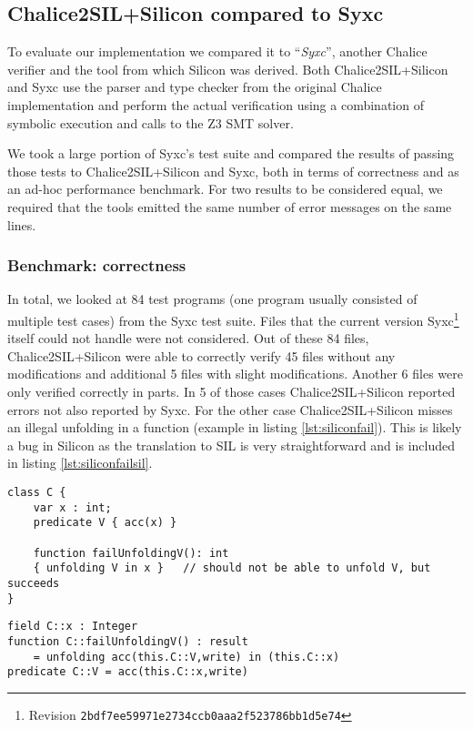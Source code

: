 \subsection{Chalice2SIL+Silicon compared to Syxc}
To evaluate our implementation we compared it to ``\emph{Syxc}'', another Chalice verifier and the tool from which Silicon was derived.
Both Chalice2SIL+Silicon and Syxc use the parser and type checker from the original Chalice implementation and perform the actual verification using a combination of symbolic execution and calls to the Z3 SMT solver.

We took a large portion of Syxc's test suite and compared the results of passing those tests to Chalice2SIL+Silicon and Syxc, both in terms of correctness and as an ad-hoc performance benchmark.
For two results to be considered equal, we required that the tools emitted the same number of error messages on the same lines.

\subsubsection{Benchmark: correctness}
In total, we looked at 84 test programs (one program usually consisted of multiple test cases) from the Syxc test suite. 
Files that the current version Syxc\footnote{Revision \texttt{2bdf7ee59971e2734ccb0aaa2f523786bb1d5e74}} itself could not handle were not considered.
Out of these 84 files, Chalice2SIL+Silicon were able to correctly verify 45 files without any modifications and additional 5 files with slight modifications.
Another 6 files were only verified correctly in parts.
In 5 of those cases Chalice2SIL+Silicon reported errors not also reported by Syxc.
For the other case Chalice2SIL+Silicon misses an illegal unfolding in a function (example in listing \ref{lst:siliconfail}).
This is likely a bug in Silicon as the translation to SIL is very straightforward and is included in listing \ref{lst:siliconfailsil}.

\begin{lstlisting}[language=Chalice,float,caption={Error that is not detected by Chalice2SIL+Silicon.},label={lst:siliconfail}]
class C {
    var x : int;
    predicate V { acc(x) }

	function failUnfoldingV(): int
	{ unfolding V in x }   // should not be able to unfold V, but succeeds
}
\end{lstlisting}

\begin{lstlisting}[language=SIL,float,caption={SIL translation of \ref{lst:siliconfail}},label={lst:siliconfailsil}]
field C::x : Integer
function C::failUnfoldingV() : result 
	= unfolding acc(this.C::V,write) in (this.C::x)
predicate C::V = acc(this.C::x,write)
\end{lstlisting}




